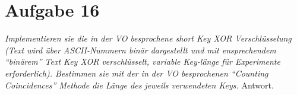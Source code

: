 \section{Aufgabe 16}
\textit{Implementieren sie die in der VO besprochene short Key XOR Verschlüsselung (Text
wird über ASCII-Nummern binär dargestellt und mit ensprechendem “binärem” Text
Key XOR verschlüsselt, variable Key-länge für Experimente erforderlich). Bestimmen 
sie mit der in der VO besprochenen “Counting Coincidences” Methode die 
Länge des jeweils verwendeten Keys.}\vspace*{1em}\newline
Antwort.